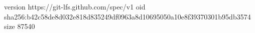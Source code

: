 version https://git-lfs.github.com/spec/v1
oid sha256:b42c58de8d032e818d835249df0963a8d10695050a10e8f39370301b95db3574
size 87540
